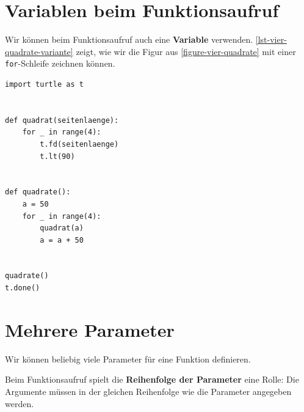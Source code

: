 \vspace{-0.5cm}


\vspace{-0.5cm}

\section{Variablen beim Funktionsaufruf}

Wir können beim Funktionsaufruf auch eine \textbf{Variable} verwenden. \autoref{lst-vier-quadrate-variante} zeigt, wie wir die Figur aus \autoref{figure-vier-quadrate} mit einer \lstinline{for}-Schleife zeichnen können.

\begin{lstlisting}[language={python3}, caption={Variable beim Funktionsaufruf (\graybgtexttt{vier\_quadrate\_variante.py}).}, label={lst-vier-quadrate-variante}]
import turtle as t


def quadrat(seitenlaenge):
	for _ in range(4):
		t.fd(seitenlaenge)
		t.lt(90)


def quadrate():
	a = 50
	for _ in range(4):
		quadrat(a)
		a = a + 50


quadrate()
t.done()

\end{lstlisting}

\section{Mehrere Parameter}

Wir können beliebig viele Parameter für eine Funktion definieren. 

\begin{important}
Beim Funktionsaufruf spielt die \textbf{Reihenfolge der Parameter} eine Rolle: Die Argumente müssen in der gleichen Reihenfolge wie die Parameter angegeben werden.
\end{important}

